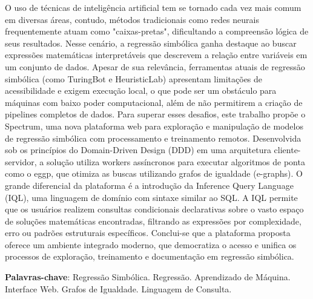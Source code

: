 \documentclass[
  12pt,
  oneside,
  a4paper,
  chapter=TITLE,
  section=TITLE,
  subsection=TITLE,
  subsubsection=TITLE,
  english,
  brazil,
]{abntex2}
\begin{document}
\begin{resumo}
O uso de técnicas de inteligência artificial tem se tornado cada vez mais comum em diversas áreas, contudo, métodos tradicionais como redes neurais frequentemente atuam como "caixas-pretas", dificultando a compreensão lógica de seus resultados. Nesse cenário, a regressão simbólica ganha destaque ao buscar expressões matemáticas interpretáveis que descrevem a relação entre variáveis em um conjunto de dados. Apesar de sua relevância, ferramentas atuais de regressão simbólica (como TuringBot e HeuristicLab) apresentam limitações de acessibilidade e exigem execução local, o que pode ser um obstáculo para máquinas com baixo poder computacional, além de não permitirem a criação de pipelines completos de dados. Para superar esses desafios, este trabalho propõe o Spectrum, uma nova plataforma web para exploração e manipulação de modelos de regressão simbólica com processamento e treinamento remotos. Desenvolvida sob os princípios do Domain-Driven Design (DDD) em uma arquitetura cliente-servidor, a solução utiliza workers assíncronos para executar algoritmos de ponta como o eggp, que otimiza as buscas utilizando grafos de igualdade (e-graphs). O grande diferencial da plataforma é a introdução da Inference Query Language (IQL), uma linguagem de domínio com sintaxe similar ao SQL. A IQL permite que os usuários realizem consultas condicionais declarativas sobre o vasto espaço de soluções matemáticas encontradas, filtrando as expressões por complexidade, erro ou padrões estruturais específicos. Conclui-se que a plataforma proposta oferece um ambiente integrado moderno, que democratiza o acesso e unifica os processos de exploração, treinamento e documentação em regressão simbólica.

  \vspace{\onelineskip}
  \noindent
  \textbf{Palavras-chave}: Regressão Simbólica. Regressão. Aprendizado de Máquina. Interface Web. Grafos de Igualdade. Linguagem de Consulta.
\end{resumo}
\end{document}
